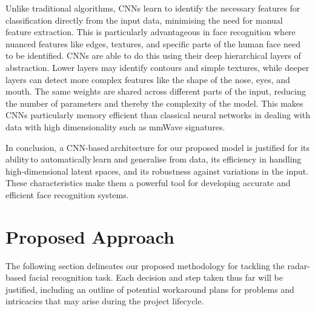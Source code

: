 \documentclass{interim}
\begin{document}
Unlike traditional algorithms, CNNs learn to identify the necessary features for classification directly from the input data, minimising the need for manual feature extraction. This is particularly advantageous in face recognition where nuanced features like edges, textures, and specific parts of the human face need to be identified. CNNs are able to do this using their deep hierarchical layers of abstraction. Lower layers may identify contours and simple textures, while deeper layers can detect more complex features like the shape of the nose, eyes, and mouth. The same weights are shared across different parts of the input, reducing the number of parameters and thereby the complexity of the model. This makes CNNs particularly memory efficient than classical neural networks in dealing with data with high dimensionality \cite{goodfellow2016deep} such as mmWave signatures.

In conclusion, a CNN-based\,architecture for our proposed model is justified for its ability\,to automatically\,learn and generalise from data, its efficiency in handling high-dimensional latent spaces, and its robustness against variations in the input.\,These characteristics make them a powerful tool for developing accurate and efficient face recognition systems.


\section{Proposed Approach}
The following section delineates our proposed methodology for tackling the radar-based facial recognition task. Each decision and step taken thus far will be justified, including an outline of potential workaround plans for problems and intricacies that may arise during the project lifecycle.
\end{document}
